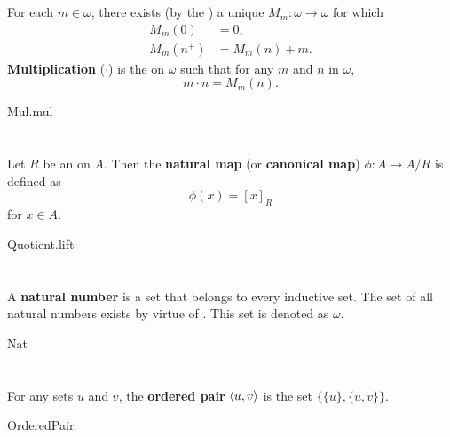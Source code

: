 \documentclass{report}
\begin{document}
\section{}%

  For each $m \in \omega$, there exists (by the
    ) a unique
     $M_m \colon \omega \rightarrow \omega$ for which
    \begin{align*}
      M_m(0) & = 0, \\
      M_m(n^+) & = M_m(n) + m.
    \end{align*}
  \textbf{Multiplication} ($\cdot$) is the  on
    $\omega$ such that for any $m$ and $n$ in $\omega$, $$m \cdot n = M_m(n).$$

    {Mul.mul}

\section{}%

  Let $R$ be an  on $A$.
  Then the \textbf{natural map} (or \textbf{canonical map})
    $\phi \colon A \rightarrow A / R$ is defined as $$\phi(x) = [x]_R$$ for
    $x \in A$.

    {Quotient.lift}

\section{}%

  A \textbf{natural number} is a set that belongs to every inductive set.
  The set of all natural numbers exists by virtue of .
  This set is denoted as $\omega$.

    {Nat}

\section{}%

  For any sets $u$ and $v$, the \textbf{ordered pair} $\left< u, v \right>$ is
    the set $\{\{u\}, \{u, v\}\}$.

    {OrderedPair}
\end{document}
